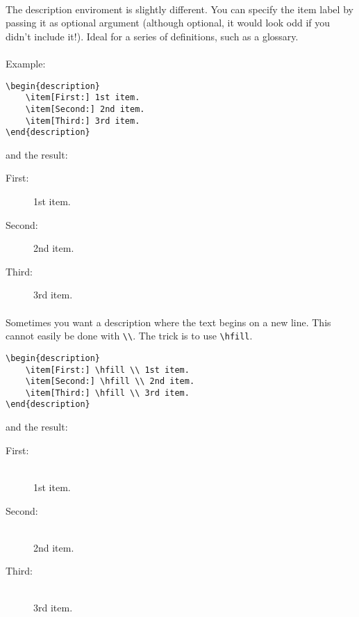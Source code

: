 \paragraph{}
The description enviroment is slightly different.
You can specify the item label by passing it as optional argument
(although optional, it would look odd if you didn't include it!). Ideal for
a series of definitions, such as a glossary.
\paragraph{}
Example:
\begin{verbatim}
\begin{description}
	\item[First:] 1st item.
	\item[Second:] 2nd item.
	\item[Third:] 3rd item.
\end{description}
\end{verbatim}
and the result:
\begin{description}
	\item[First:] 1st item.
	\item[Second:] 2nd item.
	\item[Third:] 3rd item.
\end{description}

\paragraph{}
Sometimes you want a description where the text begins on a new line.
This cannot easily be done with \verb|\\|. The trick is to use
\verb|\hfill|.
\begin{verbatim}
\begin{description}
	\item[First:] \hfill \\ 1st item.
	\item[Second:] \hfill \\ 2nd item.
	\item[Third:] \hfill \\ 3rd item.
\end{description}
\end{verbatim}
and the result:
\begin{description}
	\item[First:] \hfill \\ 1st item.
	\item[Second:] \hfill \\ 2nd item.
	\item[Third:] \hfill \\ 3rd item.
\end{description}

